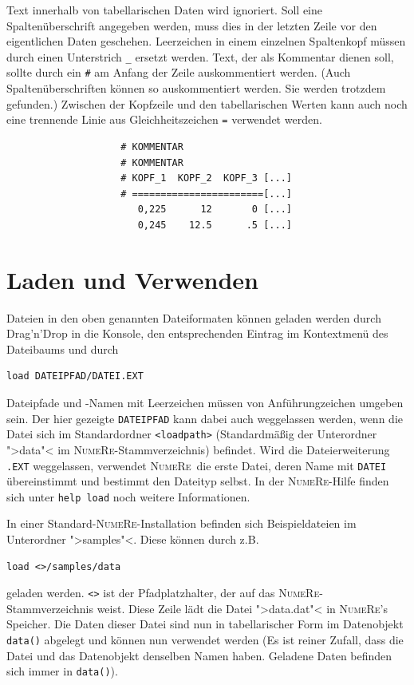 \documentclass[DIV=14,headsepline,footsepline]{scrbook}
\newcommand{\NR}{\textsc{Nu\-me\-Re}}
\begin{document}
				Text innerhalb von tabellarischen Daten wird ignoriert. Soll eine Spaltenüberschrift angegeben werden, muss dies in der letzten Zeile vor den eigentlichen Daten geschehen. Leerzeichen in einem einzelnen Spaltenkopf müssen durch einen Unterstrich \lstinline+_+ ersetzt werden. Text, der als Kommentar dienen soll, sollte durch ein \lstinline+#+ am Anfang der Zeile auskommentiert werden. (Auch Spaltenüberschriften können so auskommentiert werden. Sie werden trotzdem gefunden.) Zwischen der Kopfzeile und den tabellarischen Werten kann auch noch eine trennende Linie aus Gleichheitszeichen \lstinline+=+ verwendet werden.
				\begin{verbatim}
					# KOMMENTAR
					# KOMMENTAR
					# KOPF_1  KOPF_2  KOPF_3 [...]
					# =======================[...]
					   0,225      12       0 [...]
					   0,245    12.5      .5 [...]
				\end{verbatim}
				
			\section{Laden und Verwenden}
				Dateien in den oben genannten Dateiformaten können geladen werden durch Drag'n'Drop in die Konsole, den entsprechenden Eintrag im Kontextmenü des Dateibaums und durch
				\begin{lstlisting}
load DATEIPFAD/DATEI.EXT
				\end{lstlisting}
				Dateipfade und -Namen mit Leerzeichen müssen von Anführungzeichen umgeben sein. Der hier gezeigte \lstinline+DATEIPFAD+ kann dabei auch weggelassen werden, wenn die Datei sich im Standardordner \verb+<loadpath>+ (Standardmäßig der Unterordner ">data"< im \NR-Stammverzeichnis) befindet. Wird die Dateierweiterung \lstinline+.EXT+ weggelassen, verwendet \NR\ die erste Datei, deren Name mit \lstinline+DATEI+ übereinstimmt und bestimmt den Dateityp selbst. In der \NR-Hilfe finden sich unter \lstinline+help load+ noch weitere Informationen.
				
				In einer Standard-\NR-Installation befinden sich Beispieldateien im Unterordner ">samples"<. Diese können durch z.B.
				\begin{lstlisting}
load <>/samples/data
				\end{lstlisting}
				geladen werden. \lstinline+<>+ ist der Pfadplatzhalter, der auf das \NR-Stammverzeichnis weist. Diese Zeile lädt die Datei ">data.dat"< in \NR's Speicher. Die Daten dieser Datei sind nun in tabellarischer Form im Datenobjekt \lstinline+data()+ abgelegt und können nun verwendet werden (Es ist reiner Zufall, dass die Datei und das Datenobjekt denselben Namen haben. Geladene Daten befinden sich immer in \lstinline+data()+).
				
\end{document}
